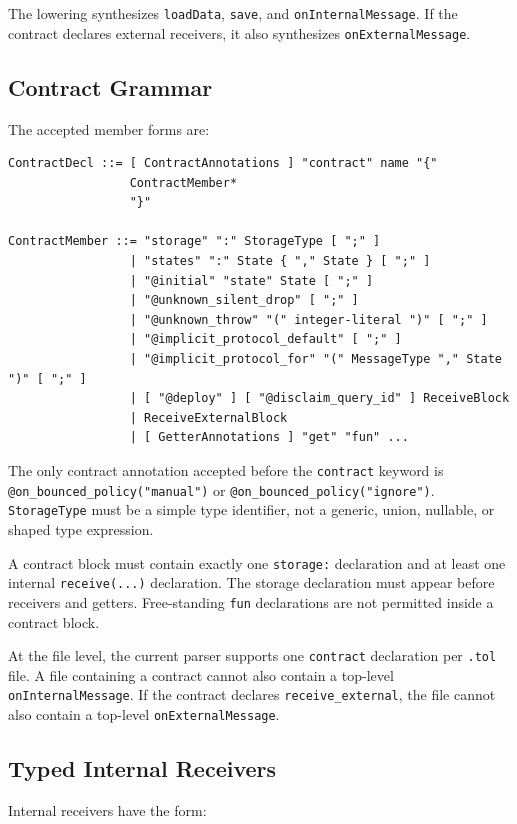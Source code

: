 \documentclass[12pt,oneside]{article}
\begin{document}
The lowering synthesizes \verb|loadData|, \verb|save|, and
\verb|onInternalMessage|. If the contract declares external receivers, it also
synthesizes \verb|onExternalMessage|.

\subsection{Contract Grammar}
The accepted member forms are:

\begin{verbatim}
ContractDecl ::= [ ContractAnnotations ] "contract" name "{"
                 ContractMember*
                 "}"

ContractMember ::= "storage" ":" StorageType [ ";" ]
                 | "states" ":" State { "," State } [ ";" ]
                 | "@initial" "state" State [ ";" ]
                 | "@unknown_silent_drop" [ ";" ]
                 | "@unknown_throw" "(" integer-literal ")" [ ";" ]
                 | "@implicit_protocol_default" [ ";" ]
                 | "@implicit_protocol_for" "(" MessageType "," State ")" [ ";" ]
                 | [ "@deploy" ] [ "@disclaim_query_id" ] ReceiveBlock
                 | ReceiveExternalBlock
                 | [ GetterAnnotations ] "get" "fun" ...
\end{verbatim}

The only contract annotation accepted before the \verb|contract| keyword is
\verb|@on_bounced_policy("manual")| or \verb|@on_bounced_policy("ignore")|.
\verb|StorageType| must be a simple type identifier, not a generic, union,
nullable, or shaped type expression.

A contract block must contain exactly one \verb|storage:| declaration and at
least one internal \verb|receive(...)| declaration. The storage declaration
must appear before receivers and getters. Free-standing \verb|fun|
declarations are not permitted inside a contract block.

At the file level, the current parser supports one \verb|contract| declaration
per \verb|.tol| file. A file containing a contract cannot also contain a
top-level \verb|onInternalMessage|. If the contract declares
\verb|receive_external|, the file cannot also contain a top-level
\verb|onExternalMessage|.

\subsection{Typed Internal Receivers}
Internal receivers have the form:
\end{document}
